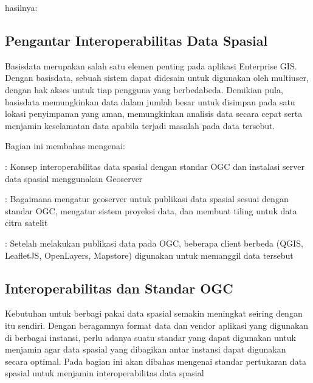 \documentclass[letterpaper,10pt,english]{sphinxmanual}
\begin{document}
hasilnya:



\subsection{Pengantar Interoperabilitas Data Spasial}
\label{\detokenize{sesi3/introogc:pengantar-interoperabilitas-data-spasial}}\label{\detokenize{sesi3/introogc::doc}}
Basisdata merupakan salah satu elemen penting pada aplikasi Enterprise GIS. Dengan basisdata, sebuah sistem dapat didesain untuk digunakan oleh multi\sphinxhyphen{}user, dengan hak akses untuk tiap pengguna yang berbeda\sphinxhyphen{}beda. Demikian pula, basisdata memungkinkan data dalam jumlah besar untuk disimpan pada satu lokasi penyimpanan yang aman, memungkinkan analisis data secara cepat serta menjamin keselamatan data apabila terjadi masalah pada data tersebut.

Bagian ini membahas mengenai:

 {\hyperref[\detokenize{sesi3/interoperabilitas::doc}]{}}
: Konsep interoperabilitas data spasial dengan standar OGC dan instalasi server data spasial menggunakan Geoserver

 {\hyperref[\detokenize{sesi3/publikasi::doc}]{}}
: Bagaimana mengatur geoserver untuk publikasi data spasial sesuai dengan standar OGC, mengatur sistem proyeksi data, dan membuat tiling untuk data citra satelit

 {\hyperref[\detokenize{sesi3/konsumsiogc::doc}]{}}
: Setelah melakukan publikasi data pada OGC, beberapa client berbeda (QGIS, LeafletJS, OpenLayers, Mapstore) digunakan untuk memanggil data tersebut






\subsection{Interoperabilitas dan Standar OGC}
\label{\detokenize{sesi3/interoperabilitas:interoperabilitas-dan-standar-ogc}}\label{\detokenize{sesi3/interoperabilitas::doc}}
Kebutuhan untuk berbagi pakai data spasial semakin meningkat seiring dengan  itu sendiri. Dengan beragamnya format data dan vendor aplikasi yang digunakan di berbagai instansi, perlu adanya suatu standar yang dapat digunakan untuk menjamin agar data spasial yang dibagikan antar instansi dapat digunakan secara optimal. Pada bagian ini akan dibahas mengenai standar pertukaran data spasial untuk menjamin interoperabilitas data spasial
\end{document}
